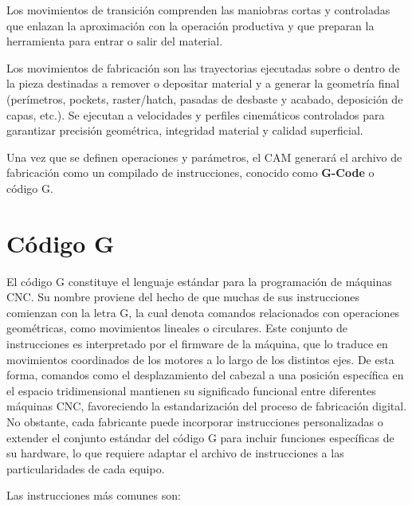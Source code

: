Los movimientos de transición comprenden las maniobras cortas y controladas que enlazan la aproximación con la operación productiva y que preparan la herramienta para entrar o salir del material. 

Los movimientos de fabricación son las trayectorias ejecutadas sobre o dentro de la pieza destinadas a remover o depositar material y a generar la geometría final (perímetros, pockets, raster/hatch, pasadas de desbaste y acabado, deposición de capas, etc.). Se ejecutan a velocidades y perfiles cinemáticos controlados para garantizar precisión geométrica, integridad material y calidad superficial. 

Una vez que se definen operaciones y parámetros, el CAM generará el archivo de fabricación como un compilado de instrucciones, conocido como \textbf{G-Code} o código G.

\section{Código G}

El código G constituye el lenguaje estándar para la programación de máquinas CNC. Su nombre proviene del hecho de que muchas de sus instrucciones comienzan con la letra G, la cual denota comandos relacionados con operaciones geométricas, como movimientos lineales o circulares. Este conjunto de instrucciones es interpretado por el firmware de la máquina, que lo traduce en movimientos coordinados de los motores a lo largo de los distintos ejes. De esta forma, comandos como el desplazamiento del cabezal a una posición específica en el espacio tridimensional mantienen su significado funcional entre diferentes máquinas CNC, favoreciendo la estandarización del proceso de fabricación digital. No obstante, cada fabricante puede incorporar instrucciones personalizadas o extender el conjunto estándar del código G para incluir funciones específicas de su hardware, lo que requiere adaptar el archivo de instrucciones a las particularidades de cada equipo.

Las instrucciones más comunes son:

